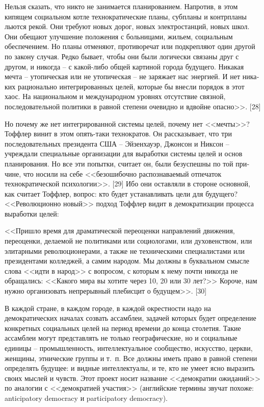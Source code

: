 \documentclass{book}
\begin{document}
{Нельзя сказать, что никто не занимается планированием. Напротив, в этом кипящем социальном котле технократические планы, субпланы и контрпланы льются рекой. Они требуют новых дорог, новых электростанций, новых школ. Они обещают улучшение положения с больницами, жильем, социальным обеспечением. Но планы отменяют, противоречат или подкрепляют один другой по закону случая. Редко бывает, чтобы они были логически связаны друг с другом, и никогда -- с какой-либо общей картиной города будущего. Никакая мечта -- утопиче­ская или не утопическая -- не заряжает нас энергией. И нет ника­ких рационально интегрированных целей, которые бы внесли порядок в этот хаос. На национальном и международном уров­нях отсутствие связной, последовательной политики в равной степени очевидно и вдвойне опасно>>. [28] 

Но почему же нет интегрированной системы целей, почему нет <<мечты>>? Тоффлер винит в этом опять-таки технократов. Он рассказывает, что три последовательных президента США -- Эйзенхауэр, Джонсон и Никсон -- учреждали специальные орга­низации для выработки системы целей и основ планирования. Но все эти попытки, считает он, были безуспешны по той при­чине, что носили на себе <<безошибочно распознаваемый отпе­чаток технократической психологии>>. [29] Ибо они оставляли в стороне основной, как считает Тоффлер, вопрос: кто будет устанавливать цели для будущего? <<Революционно новый>> под­ход Тоффлер видит в демократизации процесса выработки це­лей:

<<Пришло время для драматической переоценки направлений движения, переоценки, делаемой не политиками или социоло­гами, или духовенством, или элитарными революционерами, а также не техническими специалистами или президентами кол­леджей, а самим народом. Мы должны в буквальном смысле слова <<идти в народ>> с вопросом, с которым к нему почти ни­когда не обращались: <<Какого мира вы хотите через 10, 20 или 30 лет?>> Короче, нам нужно организовать непрерывный плебис­цит о будущем>>. [30]

В каждой стране, в каждом городе, в каждой окрестности надо на демократических началах созвать ассамблеи, задачей которых будет определение конкретных социальных целей на период времени до конца столетия. Такие ассамблеи могут представлять не только географические, но и социальные единицы -- промышленность, интеллектуальное сообщество, искусство, церкви, женщины, этнические группы и т.~п. Все должны иметь право в равной степени определять будущее: и видные интеллектуалы, и те, кто не умеет ясно выразить своих мыслей и чувств. Этот проект носит название <<демократии ожиданий>> по аналогии с <<демократией участия>> (английские термины звучат похоже: anticipatory democracy и participatory democracy).

}
\end{document}
